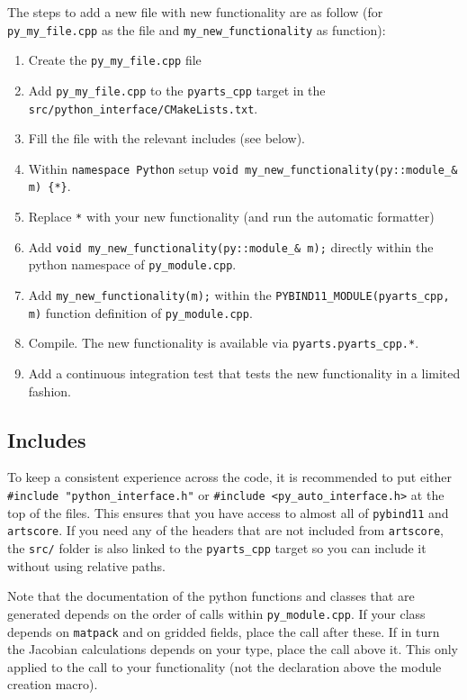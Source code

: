 The steps to add a new file with new functionality are as follow (for \verb|py_my_file.cpp| as the file and \verb|my_new_functionality| as function):
\begin{enumerate}
\item Create the \verb|py_my_file.cpp| file
\item Add \verb|py_my_file.cpp| to the \verb|pyarts_cpp| target in the \verb|src/python_interface/CMakeLists.txt|.
\item Fill the file with the relevant includes (see below).
\item Within \verb|namespace Python| setup \verb|void my_new_functionality(py::module_& m) {*}|.
\item Replace \verb|*| with your new functionality (and run the automatic formatter)
\item Add \verb|void my_new_functionality(py::module_& m);| directly within the python namespace of  \verb|py_module.cpp|.
\item Add \verb|my_new_functionality(m);| within the \verb|PYBIND11_MODULE(pyarts_cpp, m)| function definition of  \verb|py_module.cpp|.
\item Compile.  The new functionality is available via \verb|pyarts.pyarts_cpp.*|.
\item Add a continuous integration test that tests the new functionality in a limited fashion.
\end{enumerate}

\subsection{Includes}
To keep a consistent experience across the code, it is recommended to put either \verb|#include "python_interface.h"| or \verb|#include <py_auto_interface.h>|
at the top of the files.  This ensures that you have access to almost all of \verb|pybind11| and \verb|artscore|.  If you need any of the headers that are
not included from \verb|artscore|, the \verb|src/| folder is also linked to the \verb|pyarts_cpp| target so you can include it without using relative paths.

Note that the documentation of the python functions and classes that are generated depends on the order of calls within \verb|py_module.cpp|.  If your
class depends on  \verb|matpack| and on gridded fields, place the call after these.  If in turn the Jacobian calculations depends on your type,
place the call above it.  This only applied to the call to your functionality (not the declaration above the module creation macro).

